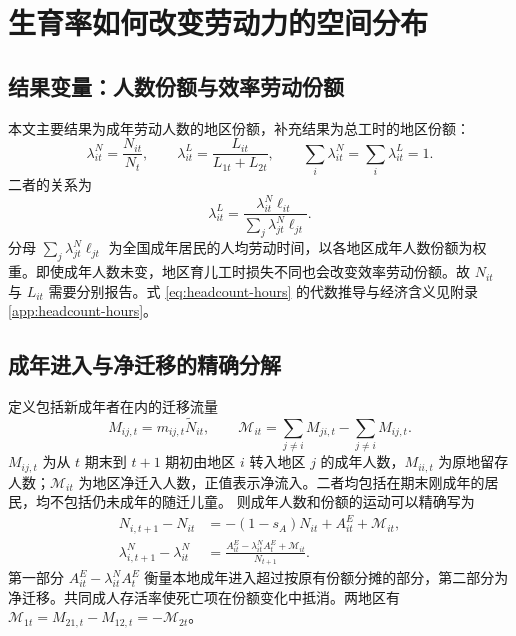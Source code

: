 \documentclass[UTF8,a4paper,zihao=-4,fontset=windows]{ctexart}
\numberwithin{equation}{section}
\begin{document}
\section{生育率如何改变劳动力的空间分布}
\label{sec:spatial-outcomes}

\subsection{结果变量：人数份额与效率劳动份额}
本文主要结果为成年劳动人数的地区份额，补充结果为总工时的地区份额：
\begin{equation}
  \lambda^N_{it}=\frac{N_{it}}{N_t},\qquad
  \lambda^L_{it}=\frac{L_{it}}{L_{1t}+L_{2t}},\qquad
  \sum_i\lambda^N_{it}=\sum_i\lambda^L_{it}=1.
  \label{eq:spatial-shares}
\end{equation}
二者的关系为
\begin{equation}
  \lambda^L_{it}=\frac{\lambda^N_{it}\ell_{it}}
      {\sum_j\lambda^N_{jt}\ell_{jt}}.
  \label{eq:headcount-hours}
\end{equation}
分母 $\sum_j\lambda^N_{jt}\ell_{jt}$ 为全国成年居民的人均劳动时间，以各地区成年人数份额为权重。即使成年人数未变，地区育儿工时损失不同也会改变效率劳动份额。故 $N_{it}$ 与 $L_{it}$ 需要分别报告。式 \eqref{eq:headcount-hours} 的代数推导与经济含义见附录\ref{app:headcount-hours}。

\subsection{成年进入与净迁移的精确分解}
定义包括新成年者在内的迁移流量
\begin{equation}
  M_{ij,t}=m_{ij,t}\widetilde N_{it},\qquad
  \mathcal M_{it}=\sum_{j\ne i}M_{ji,t}-\sum_{j\ne i}M_{ij,t}.
  \label{eq:migration-flows}
\end{equation}
$M_{ij,t}$ 为从 $t$ 期末到 $t+1$ 期初由地区 $i$ 转入地区 $j$ 的成年人数，$M_{ii,t}$ 为原地留存人数；$\mathcal M_{it}$ 为地区净迁入人数，正值表示净流入。二者均包括在期末刚成年的居民，均不包括仍未成年的随迁儿童。
则成年人数和份额的运动可以精确写为
\begin{align}
  N_{i,t+1}-N_{it}
     &=-(1-s_A)N_{it}+A^E_{it}+\mathcal M_{it},\\
  \lambda^N_{i,t+1}-\lambda^N_{it}
     &=\frac{A^E_{it}-\lambda^N_{it}A^E_t+\mathcal M_{it}}
                  {N_{t+1}}.
  \label{eq:share-decomposition}
\end{align}
第一部分 $A^E_{it}-\lambda^N_{it}A^E_t$ 衡量本地成年进入超过按原有份额分摊的部分，第二部分为净迁移。共同成人存活率使死亡项在份额变化中抵消。两地区有
$\mathcal M_{1t}=M_{21,t}-M_{12,t}=-\mathcal M_{2t}$。
\end{document}
